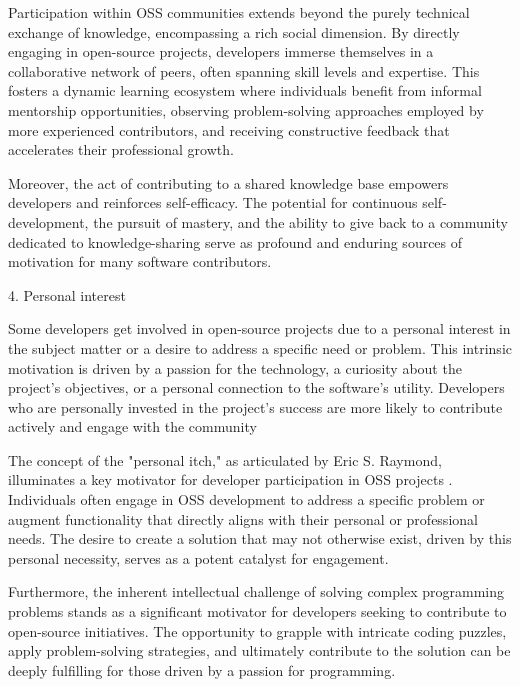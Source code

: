 Participation within OSS communities extends beyond the purely technical exchange of knowledge, encompassing a rich social dimension. By directly engaging in open-source projects, developers immerse themselves in a collaborative network of peers, often spanning skill levels and expertise. This fosters a dynamic learning ecosystem where individuals benefit from informal mentorship opportunities, observing problem-solving approaches employed by more experienced contributors, and receiving constructive feedback that accelerates their professional growth.

Moreover, the act of contributing to a shared knowledge base empowers developers and reinforces self-efficacy. The potential for continuous self-development, the pursuit of mastery, and the ability to give back to a community dedicated to knowledge-sharing serve as profound and enduring sources of motivation for many software contributors.

4. Personal interest

Some developers get involved in open-source projects due to a personal interest in the subject matter or a desire to address a specific need or problem. This intrinsic motivation is driven by a passion for the technology, a curiosity about the project's objectives, or a personal connection to the software's utility. Developers who are personally invested in the project's success are more likely to contribute actively and engage with the community \cite{06ye2003toward,07zhao2024openrank,09lakhani2005hackers,11gerosa2021shifting,12choi2015characteristics,13li2012leadership,16ke2008motivations,17alexander2002working}

The concept of the "personal itch," as articulated by Eric S. Raymond, illuminates a key motivator for developer participation in OSS projects \cite{holtgrewe2004articulating}. Individuals often engage in OSS development to address a specific problem or augment functionality that directly aligns with their personal or professional needs. The desire to create a solution that may not otherwise exist, driven by this personal necessity, serves as a potent catalyst for engagement.

Furthermore, the inherent intellectual challenge of solving complex programming problems stands as a significant motivator for developers seeking to contribute to open-source initiatives. The opportunity to grapple with intricate coding puzzles, apply problem-solving strategies, and ultimately contribute to the solution can be deeply fulfilling for those driven by a passion for programming.

